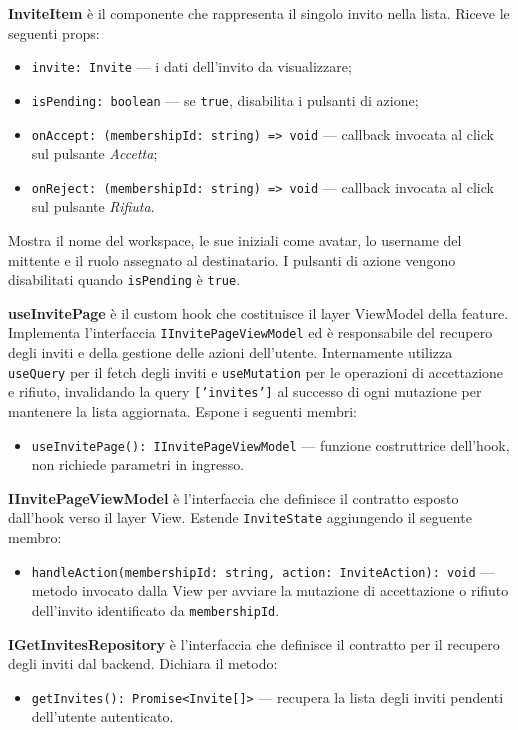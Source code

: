 \documentclass[a4paper, 11pt]{article}
\newcounter{subsubsubsection}[subsubsection]
\newcounter{subsubsubsubsection}[subsubsubsection]
\begin{document}
\textbf{InviteItem} è il componente che rappresenta il singolo invito nella lista. Riceve le
seguenti props:
\begin{itemize}
  \item \texttt{invite: Invite} — i dati dell'invito da visualizzare;
  \item \texttt{isPending: boolean} — se \texttt{true}, disabilita i pulsanti di azione;
  \item \texttt{onAccept: (membershipId: string) => void} — callback invocata al click sul
        pulsante \textit{Accetta};
  \item \texttt{onReject: (membershipId: string) => void} — callback invocata al click sul
        pulsante \textit{Rifiuta}.
\end{itemize}
Mostra il nome del workspace, le sue iniziali come avatar, lo username del mittente e il ruolo
assegnato al destinatario. I pulsanti di azione vengono disabilitati quando \texttt{isPending}
è \texttt{true}.


\textbf{useInvitePage} è il custom hook che costituisce il layer ViewModel della feature.
Implementa l'interfaccia \texttt{IInvitePageViewModel} ed è responsabile del recupero degli
inviti e della gestione delle azioni dell'utente. Internamente utilizza \texttt{useQuery} per
il fetch degli inviti e \texttt{useMutation} per le operazioni di accettazione e rifiuto,
invalidando la query \texttt{['invites']} al successo di ogni mutazione per mantenere la lista
aggiornata. Espone i seguenti membri:
\begin{itemize}
  \item \texttt{useInvitePage(): IInvitePageViewModel} — funzione costruttrice dell'hook, non
        richiede parametri in ingresso.
\end{itemize}

\textbf{IInvitePageViewModel} è l'interfaccia che definisce il contratto esposto dall'hook verso
il layer View. Estende \texttt{InviteState} aggiungendo il seguente membro:
\begin{itemize}
  \item \texttt{handleAction(membershipId: string, action: InviteAction): void} — metodo invocato
        dalla View per avviare la mutazione di accettazione o rifiuto dell'invito identificato da
        \texttt{membershipId}.
\end{itemize}


\textbf{IGetInvitesRepository} è l'interfaccia che definisce il contratto per il recupero degli
inviti dal backend. Dichiara il metodo:
\begin{itemize}
  \item \texttt{getInvites(): Promise<Invite[]>} — recupera la lista degli inviti pendenti
        dell'utente autenticato.
\end{itemize}
\end{document}
